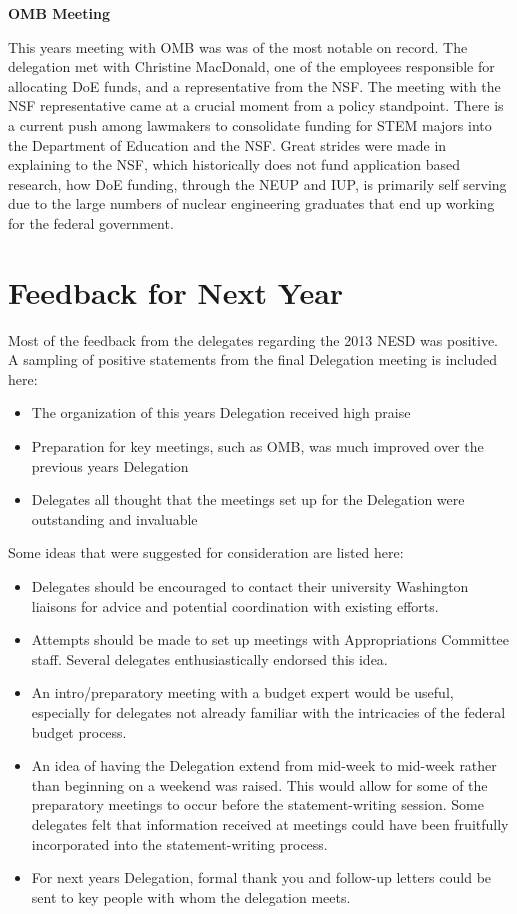\documentclass[12pt]{article}
\begin{document}
\textbf{OMB Meeting}

This years meeting with OMB was was of the most notable on record. The
delegation met with Christine MacDonald, one of the employees responsible for
allocating DoE funds, and a representative from the NSF. The meeting with the
NSF representative came at a crucial moment from a policy standpoint. There is a
current push among lawmakers to consolidate funding for STEM majors into the
Department of Education and the NSF. Great strides were made in explaining to
the NSF, which historically does not fund application based research, how DoE
funding, through the NEUP and IUP, is primarily self serving due to the large
numbers of nuclear engineering graduates that end up working for the federal
government.

\newpage
\section{Feedback for Next Year}

Most of the feedback from the delegates regarding the 2013 NESD was positive.  A
sampling of positive statements from the final Delegation meeting is included
here:

\begin{itemize}
\item The organization of this years Delegation received high praise
\item Preparation for key meetings, such as OMB, was much improved over the
  previous years Delegation
\item Delegates all thought that the meetings set up for the Delegation were
  outstanding and invaluable
\end{itemize}

Some ideas that were suggested for consideration are listed here:
\begin{itemize}
\item Delegates should be encouraged to contact their university Washington
  liaisons for advice and potential coordination with existing efforts.
\item Attempts should be made to set up meetings with Appropriations Committee
  staff.  Several delegates enthusiastically endorsed this idea.
\item An intro/preparatory meeting with a budget expert would be useful,
  especially for delegates not already familiar with the intricacies of the
  federal budget process.
\item An idea of having the Delegation extend from mid-week to mid-week rather
  than beginning on a weekend was raised.  This would allow for some of the
  preparatory meetings to occur before the statement-writing session.  Some
  delegates felt that information received at meetings could have been
  fruitfully incorporated into the statement-writing process.
\item For next years Delegation, formal thank you and follow-up letters could be
  sent to key people with whom the delegation meets.
\end{itemize}
\end{document}

